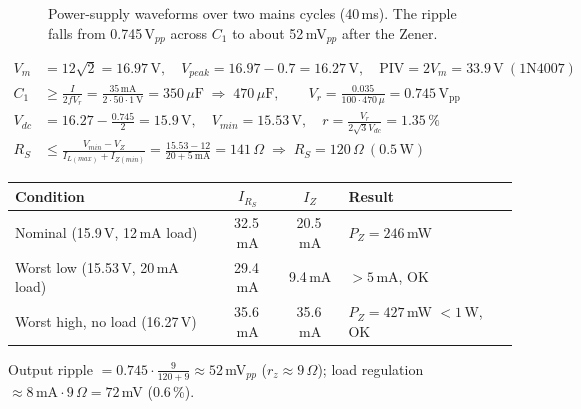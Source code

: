 \begin{figure}[H]
\centering
{}
\caption{Power-supply waveforms over two mains cycles (40\,ms). The ripple falls from 0.745\,V$_{pp}$ across $C_1$ to about 52\,mV$_{pp}$ after the Zener.}
\label{fig:psuwave}
\end{figure}

\begin{tcolorbox}[colback=blue!3,colframe=blue!40!black,title=Calculations,fonttitle=\small\bfseries,boxrule=0.4pt]
\small
\begin{align*}
V_m&=12\sqrt2=16.97\,\mathrm{V},\quad V_{peak}=16.97-0.7=16.27\,\mathrm{V},\quad \mathrm{PIV}=2V_m=33.9\,\mathrm{V}\ (\text{1N4007})\\
C_1&\ge\frac{I}{2fV_r}=\frac{35\,\mathrm{mA}}{2\cdot50\cdot1\,\mathrm{V}}=350\,\mu\mathrm F\;\Rightarrow\;470\,\mu\mathrm F,\qquad V_r=\frac{0.035}{100\cdot470\,\mu}=0.745\,\mathrm{V_{pp}}\\
V_{dc}&=16.27-\tfrac{0.745}{2}=15.9\,\mathrm V,\quad V_{min}=15.53\,\mathrm V,\quad r=\frac{V_r}{2\sqrt3V_{dc}}=1.35\,\%\\
R_S&\le\frac{V_{min}-V_Z}{I_{L(max)}+I_{Z(min)}}=\frac{15.53-12}{20+5\ \mathrm{mA}}=141\,\Omega\;\Rightarrow\;R_S=120\,\Omega\ (0.5\,\mathrm W)
\end{align*}
\begin{center}
\begin{tabular}{@{}lccl@{}}
\toprule
Condition & $I_{R_S}$ & $I_Z$ & Result \\
\midrule
Nominal (15.9\,V, 12\,mA load) & 32.5\,mA & 20.5\,mA & $P_Z=246$\,mW \\
Worst low (15.53\,V, 20\,mA load) & 29.4\,mA & 9.4\,mA & $>5$\,mA, OK \\
Worst high, no load (16.27\,V) & 35.6\,mA & 35.6\,mA & $P_Z=427$\,mW $<1$\,W, OK \\
\bottomrule
\end{tabular}
\end{center}
Output ripple $=0.745\cdot\frac{9}{120+9}\approx52$\,mV$_{pp}$ ($r_z\approx9\,\Omega$); load regulation $\approx8\,\mathrm{mA}\cdot9\,\Omega=72$\,mV (0.6\,\%).
\end{tcolorbox}

